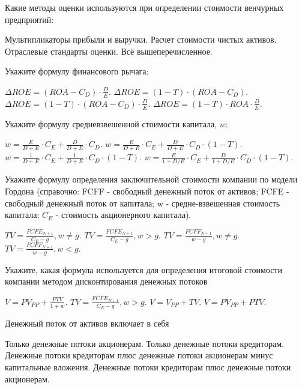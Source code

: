 \documentclass[12pt, table]{exam}
\begin{document}
\begin{questions}
\begin{multicols}{2}
\question Какие методы оценки используются при определении стоимости венчурных предприятий:
\begin{choices}
	\choice Мультипликаторы прибыли и выручки.
	\choice Расчет стоимости чистых активов.
	\choice Отраслевые стандарты оценки.
	\CC Всё вышеперечисленное.
\end{choices}

\question Укажите формулу финансового рычага:
\begin{choices}
	\choice $\Delta ROE=(ROA-C_D ) \cdot \frac{D}{E}$.
	\choice $\Delta ROE=(1-T) \cdot (ROA-C_D )$.
	\CC $\Delta ROE=(1-T) \cdot (ROA-C_D ) \cdot \frac{D}{E}$.
	\choice $\Delta ROE=(1-T) \cdot ROA \cdot \frac{D}{E} $.
\end{choices}

\question Укажите формулу средневзвешенной стоимости капитала, $w$:
\begin{choices}
	\choice $w=\frac{E}{D+E} \cdot C_E + \frac{D}{D+E} \cdot C_D$.
	\CC $w=\frac{E}{D+E} \cdot C_E + \frac{D}{D+E} \cdot C_D \cdot (1-T)$.
	\choice $w=\frac{1}{D+E} \cdot C_E + \frac{1}{D+E} \cdot C_D \cdot (1-T)$.
	\choice $w=\frac{E}{1+D/E} \cdot C_E + \frac{D}{1+D/E} \cdot C_D \cdot (1-T)$.
\end{choices}

\question Укажите формулу определения заключительной стоимости компании по модели Гордона (справочно: FCFF - свободный денежный поток от активов; FCFE - свободный денежный поток от капитала; w - средне-взвешенная стоимость капитала; $C_E$ - стоимость акционерного капитала).
\begin{choices}
	\choice $TV=\frac{FCFE_{N+1}}{C_E-g}, w\neq g$.
	\choice $TV=\frac{FCFE_{N+1}}{C_E-g}, w>g$.
	\CC $TV=\frac{FCFF_{N+1}}{w-g}, w\neq g$.
	\choice $TV=\frac{FCFF_{N+1}}{w-g}, w < g$.
\end{choices}

\question Укажите, какая формула используется для определения итоговой стоимости компании методом дисконтирования денежных потоков
\begin{choices}
	\choice $V=PV_{PP}+ \frac{PTV}{1+w}$.  
	\choice $TV=\frac{FCFE_{N+1}}{C_E-g}, w>g$.
	\choice $V=V_{PP}+TV$.
	\CC $V=PV_{PP}+PTV$. 
\end{choices}

\question Денежный поток от активов включает в себя
\begin{choices}
	\choice Только денежные потоки акционерам.
	\choice Только денежные потоки кредиторам.
	\choice Денежные потоки кредиторам плюс денежные потоки акционерам минус капитальные вложения.
	\CC Денежные потоки кредиторам плюс денежные потоки акционерам.
\end{choices}


\end{multicols}
\end{questions}
\end{document}
